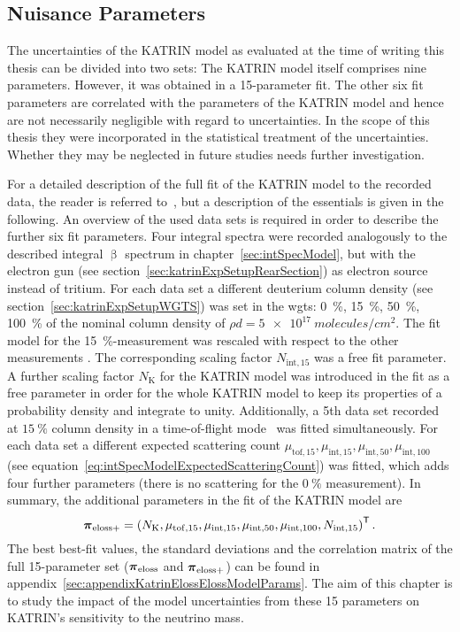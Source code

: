 \subsection{Nuisance Parameters}
The uncertainties of the KATRIN model as evaluated at the time of writing this thesis can be divided into two sets: The KATRIN model itself comprises nine parameters. However, it was obtained in a 15-parameter fit. The other six fit parameters are correlated with the parameters of the KATRIN model and hence are not necessarily negligible with regard to uncertainties. In the scope of this thesis they were incorporated in the statistical treatment of the uncertainties. Whether they may be neglected in future studies needs further investigation. 

For a detailed description of the full fit of the KATRIN model to the recorded data, the reader is referred to~\cite{Hannen2019_1}, but a description of the essentials is given in the following. An overview of the used data sets is required in order to describe the further six fit parameters. Four integral spectra were recorded analogously to the described integral $\upbeta$ spectrum in chapter~\ref{sec:intSpecModel}, but with the electron gun (see section~\ref{sec:katrinExpSetupRearSection}) as electron source instead of tritium. For each data set a different deuterium column density (see section~\ref{sec:katrinExpSetupWGTS}) was set in the \gls{wgts}: \SI{0}{\percent}, \SI{15}{\percent}, \SI{50}{\percent}, \SI{100}{\percent} of the nominal column density of $\rho d = \SI{5e17}{molecules/cm^2}$. The fit model for the \mbox{\SI{15}{\percent}-measurement} was rescaled with respect to the other measurements . The corresponding scaling factor $N_{\mathrm{int},15}$ was a free fit parameter. A further scaling factor $N_\mathrm{K}$ for the KATRIN model was introduced in the fit as a free parameter in order for the whole KATRIN model to keep its properties of a probability density and integrate to unity. Additionally, a 5th data set recorded at $\SI{15}{\percent}$ column density in a time-of-flight mode~\cite{Bonn1999} was fitted simultaneously. For each data set a different expected scattering count $
\mu_{\mathrm{tof},15},
\mu_{\mathrm{int},15}, 
\mu_{\mathrm{int},50}, 
\mu_{\mathrm{int},100}$ (see equation~\ref{eq:intSpecModelExpectedScatteringCount}) was fitted, which adds four further parameters (there is no scattering for the $\SI{0}{\percent}$ measurement). In summary, the additional parameters in the fit of the KATRIN model are
\begin{equation}
\label{eq:katrinElossElossModelExtendedParams}
	\boldsymbol{\mathbf{\pi}}_\mathrm{eloss+} = 
	{\left(
		N_\mathrm{K},
		\mu_{\mathrm{tof},15},
		\mu_{\mathrm{int},15}, 
		\mu_{\mathrm{int},50}, 
		\mu_{\mathrm{int},100},
		N_{\mathrm{int},15}
		\right)}^{\mathsf{T}}
	\text{\,.}
\end{equation}
The best best-fit values, the standard deviations and the correlation matrix of the full 15-parameter set ($\boldsymbol{\mathbf{\pi}}_\mathrm{eloss}$ and $\boldsymbol{\mathbf{\pi}}_\mathrm{eloss+}$) can be found in appendix~\ref{sec:appendixKatrinElossElossModelParams}. The aim of this chapter is to study the impact of the model uncertainties from these 15 parameters on KATRIN's sensitivity to the neutrino mass.

